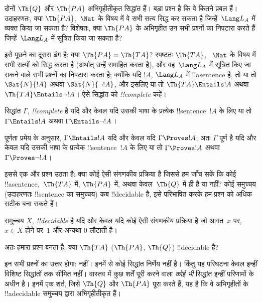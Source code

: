 \documentclass[../../../include/open-logic-section]{subfiles}
\begin{document}
दोनों $\Th{Q}$ और $\Th{PA}$ अभिगृहीतीकृत सिद्धांत हैं। बड़ा प्रश्न है कि वे
कितने प्रबल हैं। उदाहरणतः, क्या $\Th{PA}$,~$\Nat$ के विषय में वे सभी सत्य
सिद्ध कर सकता है जिन्हें~$\Lang L_A$ में व्यक्त किया जा सकता है? विशेषतः,
क्या $\Th{PA}$ के अभिगृहीत उन सभी प्रश्नों का निपटारा करते हैं जिन्हें~$\Lang
L_A$ में सूत्रित किया जा सकता है?

इसे पूछने का दूसरा ढंग है: क्या $\Th{PA} = \Th{TA}$? स्पष्टतः $\Th{TA}$,
~$\Nat$ के विषय में सभी सत्यों को सिद्ध करता है (अर्थात् उन्हें समाहित करता
है), और वह~$\Lang L_A$ में सूत्रित किए जा सकने वाले सभी प्रश्नों का निपटारा
करता है; क्योंकि यदि $!A$, $\Lang L_A$ में !!a{sentence} है, तो या तो
$\Sat{N}{!A}$ अथवा $\Sat{N}{\lnot !A}$, और इसलिए या तो $\Th{TA} \Entails
!A$ अथवा $\Th{TA} \Entails \lnot !A$। ऐसे सिद्धांत को \emph{!!{complete}}
कहें।

\begin{defn}
सिद्धांत $\Gamma$, \emph{!!{complete}} है यदि और केवल यदि उसकी भाषा के
प्रत्येक !!{sentence}~$!A$ के लिए या तो $\Gamma \Entails !A$ अथवा $\Gamma
\Entails \lnot !A$।
\end{defn}

\begin{explain}
पूर्णता प्रमेय के अनुसार, $\Gamma \Entails !A$ यदि और केवल यदि $\Gamma
\Proves !A$; अतः $\Gamma$ पूर्ण है यदि और केवल यदि उसकी भाषा के प्रत्येक
!!{sentence}~$!A$ के लिए या तो $\Gamma \Proves !A$ अथवा $\Gamma \Proves
\lnot !A$।
\end{explain}

इससे एक और प्रश्न उठता है: क्या कोई ऐसी संगणकीय प्रक्रिया है जिससे हम जाँच
सकें कि कोई !!a{sentence},~$\Th{TA}$ में, $\Th{PA}$ में, अथवा केवल~$\Th{Q}$
में ही है या नहीं? कोई समुच्चय (उदाहरणतः !!{sentence} का समुच्चय) कब
!!{decidable} है, इसे परिभाषित करके हम प्रश्न को अधिक सटीक बना सकते हैं।

\begin{defn}
समुच्चय $X$, \emph{!!{decidable}} है यदि और केवल यदि कोई ऐसी संगणकीय
प्रक्रिया है जो आगत~$x$ पर, $x \in X$ होने पर~$1$ और अन्यथा $0$ लौटाती है।
\end{defn}

अतः हमारा प्रश्न बनता है: क्या $\Th{TA}$ ($\Th{PA}$, $\Th{Q}$) !!{decidable}
है?

इन सभी प्रश्नों का उत्तर होगा: नहीं। इनमें से कोई सिद्धांत निर्णेय नहीं है।
किंतु यह परिघटना केवल इन्हीं विशिष्ट सिद्धांतों तक सीमित नहीं। वास्तव में
कुछ शर्तें पूरी करने वाला \emph{कोई भी} सिद्धांत इन्हीं परिणामों के अधीन है।
इनमें एक शर्त, जिसे $\Th{Q}$ और $\Th{PA}$ पूरा करते हैं, यह है कि वे
अभिगृहीतों के !!a{decidable} समुच्चय द्वारा अभिगृहीतीकृत हैं।
\end{document}

